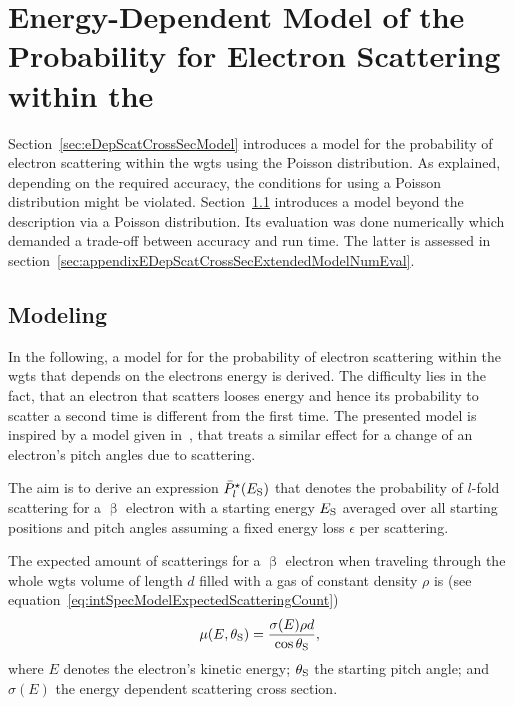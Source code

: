 \section{Energy-Dependent Model of the Probability for Electron Scattering within the }
\label{sec:appendixEDepScatCrossSecExtendedModel}
Section~\ref{sec:eDepScatCrossSecModel} introduces a model for the probability of electron scattering within the \gls{wgts} using the Poisson distribution. As explained, depending on the required accuracy, the conditions for using a Poisson distribution might be violated. Section~\ref{sec:appendixEDepScatCrossSecExtendedModelFormalism} introduces a model beyond the description via a Poisson distribution. Its evaluation was done numerically which demanded a trade-off between accuracy and run time. The latter is assessed in section~\ref{sec:appendixEDepScatCrossSecExtendedModelNumEval}.
\subsection{Modeling}
\label{sec:appendixEDepScatCrossSecExtendedModelFormalism}
In the following, a model for for the probability of electron scattering within the \gls{wgts} that depends on the electrons energy is derived. The difficulty lies in the fact, that an electron that scatters looses energy and hence its probability to scatter a second time is different from the first time. The presented model is inspired by a model given in~\cite{Groh2015}, that treats a similar effect for a change of an electron's pitch angles due to scattering. 

The aim is to derive an expression $\bar{P}^{\star}_l(E_\mathrm{S})$ that denotes the probability of $l$-fold scattering for a $\upbeta$ electron with a starting energy $E_\mathrm{S}$ averaged over all starting positions and pitch angles assuming a fixed energy loss $\epsilon$ per scattering.

The expected amount of scatterings for a $\upbeta$ electron when traveling  through the whole \gls{wgts} volume of length $d$ filled with a gas of constant density $\rho$ is (see equation~\ref{eq:intSpecModelExpectedScatteringCount})
\begin{equation}
    \mu(E,\theta_\mathrm{S}) =
    \frac{\sigma(E)\rho d}{\cos\theta_\mathrm{S}},
\end{equation}
where $E$ denotes the electron's kinetic energy; $\theta_\mathrm{S}$ the starting pitch angle; and $\sigma(E)$ the energy dependent scattering cross section.

